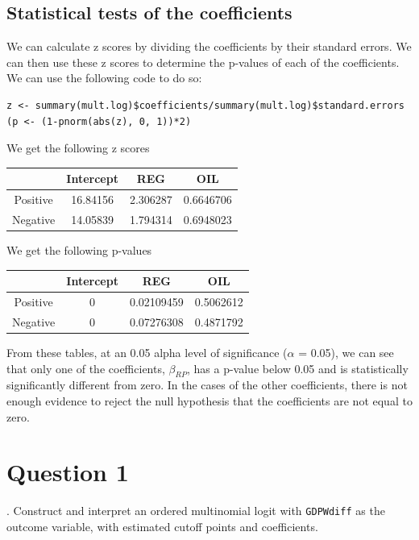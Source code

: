 \documentclass[12pt,letterpaper]{article}
\begin{document}
\subsection{Statistical tests of the coefficients}

\noindent We can calculate z scores by dividing the coefficients by their standard errors. We can then use these z scores to determine the p-values of each of the coefficients. We can use the following code to do so:

\begin{lstlisting}
z <- summary(mult.log)$coefficients/summary(mult.log)$standard.errors
(p <- (1-pnorm(abs(z), 0, 1))*2)
\end{lstlisting}

\noindent We get the following z scores

\begin{center}
	\begin{tabular}{||c c c c||} 
		\hline
		& Intercept & REG  & OIL \\ [0.5ex] 
		\hline\hline
		Positive &16.84156 & 2.306287& 0.6646706 \\ 
		\hline
		Negative &14.05839 & 1.794314 & 0.6948023\\ [1ex] 
		\hline
	\end{tabular}
\end{center}

\noindent We get the following p-values

\begin{center}
	\begin{tabular}{||c c c c||} 
		\hline
		& Intercept & REG  & OIL \\ [0.5ex] 
		\hline\hline
		Positive &0 & 0.02109459 & 0.5062612 \\ 
		\hline
		Negative &0 & 0.07276308 & 0.4871792\\ [1ex] 
		\hline
	\end{tabular}
\end{center}

\noindent From these tables, at an 0.05 alpha level of significance ($\alpha$ = 0.05), we can see that only one of the coefficients, $\beta_{RP}$, has a p-value below 0.05 and is statistically significantly different from zero. In the cases of the other coefficients, there is not enough evidence to reject the null hypothesis that the coefficients are not equal to zero.


\pagebreak
\section{Question 1}
. Construct and interpret an ordered multinomial logit with \texttt{GDPWdiff} as the outcome variable, with estimated cutoff points and coefficients.
\end{document}
